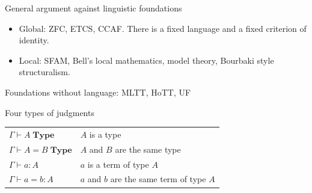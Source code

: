 \documentclass[8pt]{beamer}
\begin{document}
\begin{frame}{General argument against linguistic foundations}

\begin{itemize}
\item Global: ZFC, ETCS, CCAF.  There is a fixed language and a fixed
  criterion of identity.
\item Local: SFAM, Bell's local mathematics, model theory, Bourbaki
  style structuralism.
\end{itemize}


\end{frame}
\begin{frame}{Foundations without language: MLTT, HoTT, UF}

Four types of judgments

\bigskip
\begin{tabular}{ll}
$\Gamma\vdash A\;\mathbf{Type}$ & $A$ is a type \\
$\Gamma\vdash A=B\;\mathbf{Type}$ & $A$ and $B$ are the same type \\
$\Gamma\vdash a:A$ & $a$ is a term of type $A$ \\
$\Gamma\vdash a=b:A$ & $a$ and $b$ are the same term of type $A$
\end{tabular}



\end{frame}
\end{document}
